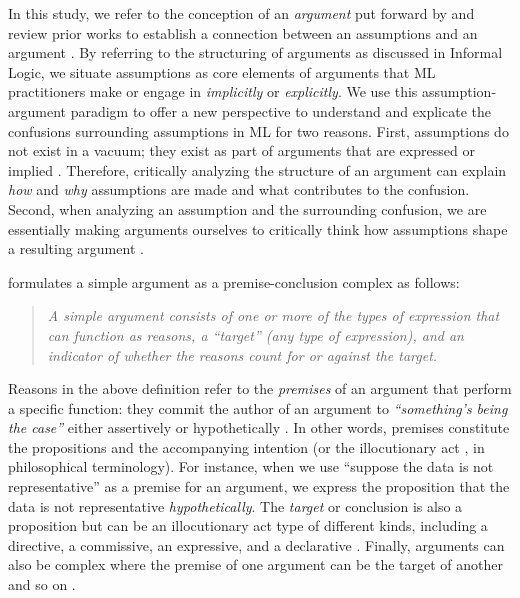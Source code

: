 In this study, we refer to the conception of an \textit{argument} put forward by \citet{hitchcock2021concept} and review prior works to establish a connection between an assumptions and an argument \cite{kingsbury2002teaching,hitchcock2007informal,govier1992good,goddu2009refining}. By referring to the structuring of arguments as discussed in Informal Logic, we situate assumptions as core elements of arguments that ML practitioners make or engage in \textit{implicitly} or \textit{explicitly}.
We use this assumption-argument paradigm to offer a new perspective to understand and explicate the confusions surrounding assumptions in ML for two reasons. First, assumptions do not exist in a vacuum; they exist as part of arguments that are expressed or implied .
Therefore, critically analyzing the structure of an argument can explain \textit{how} and \textit{why} assumptions are made and what contributes to the confusion. Second, when analyzing an assumption and the surrounding confusion, we are essentially making arguments ourselves to critically think how assumptions shape a resulting argument \cite{berman2001opening,brookfield1992uncovering,delin1994assumption,ennis1982identifying}.

 formulates a simple argument as a premise-conclusion complex as follows:
\begin{quote}
    \textit{A simple argument consists of one or more of the types of expression that can function as reasons, a ``target'' (any type of expression), and an indicator of whether the reasons count for or against the target.}
\end{quote}
Reasons in the above definition refer to the \textit{premises} of an argument that perform a specific function: they commit the author of an argument to \textit{``something's being the case''} either assertively or hypothetically . 
In other words, premises constitute the propositions and the accompanying intention (or the illocutionary act \cite{searle1975taxonomy}, in philosophical terminology). 
For instance, when we use ``suppose the data is not representative'' as a premise for an argument, we express the proposition that the data is not representative \textit{hypothetically}.  The \textit{target} or conclusion is also a proposition but can be an illocutionary act type of different kinds, including a directive, a commissive, an expressive, and a declarative \cite{toulmin1958uses,ennis2006probably}. Finally, arguments can also be complex where the premise of one argument can be the target of another and so on \cite{hitchcock2021concept}.

